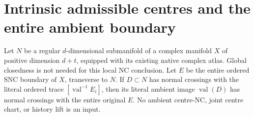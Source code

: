 \section{Intrinsic admissible centres and the entire ambient boundary}

\begin{theorem}
\label{hir:disjoint-embedded-whole-boundary-nc}
\leanok
Let $N$ be a regular $d$-dimensional submanifold of a complex manifold
$X$ of positive dimension $d+t$, equipped with its existing native complex atlas.
Global closedness is not needed for this local NC conclusion.
Let $E$ be the entire ordered SNC boundary of $X$, transverse to $N$. If
$D\subset N$ has normal crossings with the literal ordered trace
$[\operatorname{val}^{-1}E_i]$, then its literal ambient image
$\operatorname{val}(D)$ has normal crossings with the entire original $E$.
No ambient centre-NC, joint centre chart, or history lift is an input.
\end{theorem}
